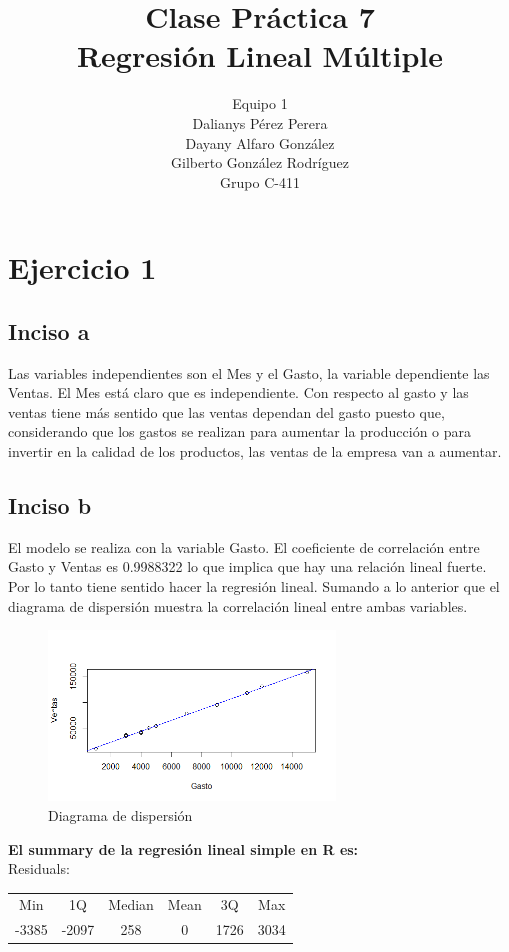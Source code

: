 \documentclass[12pt,a4paper]{article}
\author{
	Equipo 1\\
	Dalianys P\'erez Perera\\
	Dayany Alfaro González\\
	Gilberto González Rodríguez\\
	Grupo C-411 \\
}
\title{Clase Práctica 7   \\
	Regresión Lineal Múltiple
}
\date{}
\begin{document}
	\maketitle
	\section{Ejercicio 1}
	\subsection{Inciso a}
	Las variables independientes son el Mes y el Gasto, la variable dependiente las Ventas. El Mes está claro que es independiente. Con respecto al gasto y las ventas tiene más sentido que las ventas dependan del gasto puesto que, considerando que los gastos se realizan para aumentar la producción o para invertir en la calidad de los productos, las ventas de la empresa van a aumentar.
	
	\subsection{Inciso b} El modelo se realiza con la variable Gasto. El coeficiente de correlación entre Gasto y Ventas es 0.9988322 lo que implica que hay una relación lineal fuerte. Por lo tanto tiene sentido hacer la regresión lineal. Sumando a lo anterior que el diagrama de dispersión muestra la correlación lineal entre ambas variables.\\
	
		\begin{figure}[!h]
		\centering
		\includegraphics[width=3in]{images/GxV.png}
		\caption{\small{Diagrama de dispersión }}
	\end{figure}
	
	
	
	{\bf El summary de la regresión lineal simple en R es:}\\
	
	Residuals:\\

	\begin{tabular}{cccccc}
		Min&     1Q& Median& Mean&     3Q&    Max\\
		-3385&  -2097&    258& 0& 1726&   3034 
	\end{tabular}\\ 
	
\end{document}

